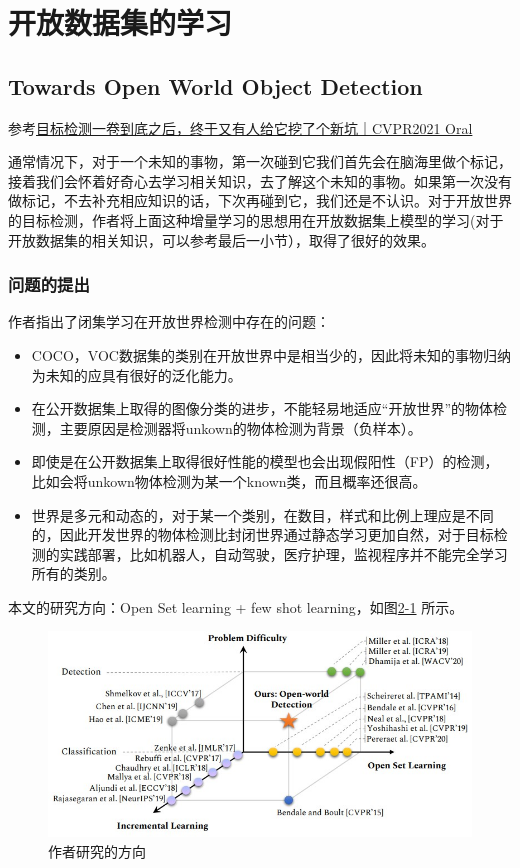 
\chapter{开放数据集的学习}

\section{Towards Open World Object Detection}

参考\href{https://zhuanlan.zhihu.com/p/357143607}{目标检测一卷到底之后，终于又有人给它挖了个新坑｜CVPR2021 Oral}

通常情况下，对于一个未知的事物，第一次碰到它我们首先会在脑海里做个标记，接着我们会怀着好奇心去学习相关知识，去了解这个未知的事物。如果第一次没有做标记，不去补充相应知识的话，下次再碰到它，我们还是不认识。对于开放世界的目标检测，作者将上面这种增量学习的思想用在开放数据集上模型的学习(对于开放数据集的相关知识，可以参考最后一小节），取得了很好的效果。

\subsection{问题的提出}

作者指出了闭集学习在开放世界检测中存在的问题：
\begin{itemize}
    \item COCO，VOC数据集的类别在开放世界中是相当少的，因此将未知的事物归纳为未知的应具有很好的泛化能力。
    \item 在公开数据集上取得的图像分类的进步，不能轻易地适应“开放世界”的物体检测，主要原因是检测器将unkown的物体检测为背景（负样本）。
    \item 即使是在公开数据集上取得很好性能的模型也会出现假阳性（FP）的检测，比如会将unkown物体检测为某一个known类，而且概率还很高。
    \item 世界是多元和动态的，对于某一个类别，在数目，样式和比例上理应是不同的，因此开发世界的物体检测比封闭世界通过静态学习更加自然，对于目标检测的实践部署，比如机器人，自动驾驶，医疗护理，监视程序并不能完全学习所有的类别。
\end{itemize}

本文的研究方向：Open Set learning + few shot learning，如图\href{fig:2-1}{2-1} 所示。

\begin{figure}
  \centering
  \includegraphics[width=4.5in]{figure/example/OpenSet6.jpg}
  \caption{作者研究的方向}
  \label{fig:2-1}
\end{figure}

